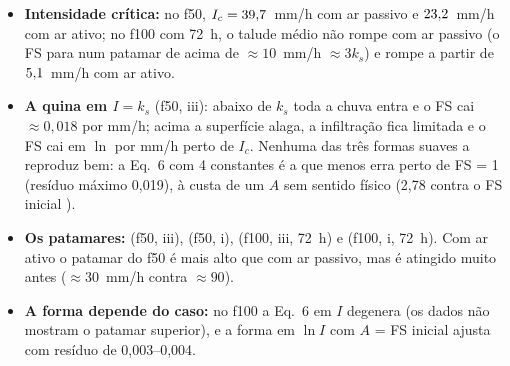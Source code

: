 \documentclass[11pt,a4paper]{article}
\begin{document}
\begin{itemize}
  \item \textbf{Intensidade crítica:} no f50, $I_c = 39{,}7$~mm/h com ar passivo e $23{,}2$~mm/h com ar ativo;
    no f100 com 72~h, o talude médio não rompe com ar passivo (o FS para num patamar de \patcemiii{} acima de
    $\approx 10$~mm/h $\approx 3k_s$) e rompe a partir de $5{,}1$~mm/h com ar ativo.
  \item \textbf{A quina em $I = k_s$} (f50, iii): abaixo de $k_s$ toda a chuva entra e o FS cai $\approx 0{,}018$ por
    mm/h; acima a superfície alaga, a infiltração fica limitada e o FS cai \decliveiii{} em $\ln$ por mm/h perto de
    $I_c$. Nenhuma das três formas suaves a reproduz bem: a Eq.~6 com 4 constantes é a que menos erra perto de FS = 1
    (resíduo máximo 0,019), à custa de um $A$ sem sentido físico (2,78 contra o FS inicial \FSzero).
  \item \textbf{Os patamares:} \patcinqiii{} (f50, iii), \patcinqi{} (f50, i), \patcemiii{} (f100, iii, 72~h) e
    \patcemi{} (f100, i, 72~h). Com ar ativo o patamar do f50 é mais alto que com ar passivo, mas é atingido muito
    antes ($\approx 30$~mm/h contra $\approx 90$).
  \item \textbf{A forma depende do caso:} no f100 a Eq.~6 em $I$ degenera (os dados não mostram o patamar superior), e
    a forma em $\ln I$ com $A$ = FS inicial ajusta com resíduo de 0,003--0,004.
\end{itemize}
\end{document}

